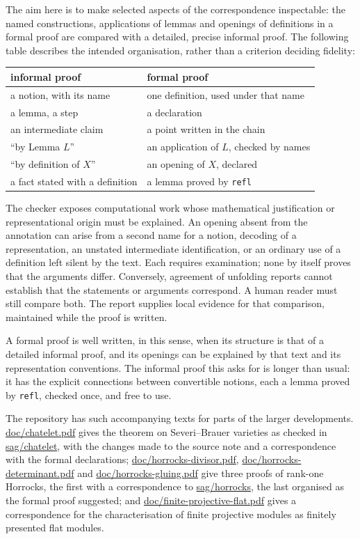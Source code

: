 \documentclass[11pt]{article}
\newcommand{\kw}[1]{\texttt{#1}}
\begin{document}
The aim here is to make selected aspects of the correspondence
inspectable: the named constructions, applications of lemmas and
openings of definitions in a formal proof are compared with a detailed,
precise informal proof. The following table describes the intended
organisation, rather than a criterion deciding fidelity:
\begin{center}
\begin{tabular}{ll}
\toprule
informal proof & formal proof\\
\midrule
a notion, with its name & one definition, used under that name\\
a lemma, a step & a declaration\\
an intermediate claim & a point written in the chain\\
``by Lemma $L$'' & an application of $L$, checked by names\\
``by definition of $X$'' & an opening of $X$, declared\\
a fact stated with a definition & a lemma proved by \kw{refl}\\
\bottomrule
\end{tabular}
\end{center}
The checker exposes computational work whose mathematical justification
or representational origin must be explained. An opening absent from
the annotation can arise from a second name for a notion, decoding of a
representation, an unstated intermediate identification, or an ordinary
use of a definition left silent by the text. Each requires examination;
none by itself proves that the arguments differ. Conversely, agreement
of unfolding reports cannot establish that the statements or arguments
correspond. A human reader must still compare both. The report supplies
local evidence for that comparison, maintained while the proof is
written.

A formal proof is well written, in this sense, when its structure is
that of a detailed informal proof, and its openings can be explained by
that text and its representation conventions. The informal proof this
asks for is longer than
usual: it has the explicit connections between convertible notions,
each a lemma proved by \kw{refl}, checked once, and free to use.

The repository has such accompanying texts for parts of the larger
developments. \url{doc/chatelet.pdf} gives the theorem on Severi--Brauer
varieties as checked in \url{sag/chatelet}, with the changes made to the source
note and a correspondence with the formal declarations;
\url{doc/horrocks-divisor.pdf}, \url{doc/horrocks-determinant.pdf}
and \url{doc/horrocks-gluing.pdf} give three proofs of rank-one
Horrocks, the first with a correspondence to \url{sag/horrocks}, the
last organised as the formal proof suggested; and
\url{doc/finite-projective-flat.pdf} gives a correspondence for the
characterisation of finite projective modules as finitely presented
flat modules.
\end{document}
